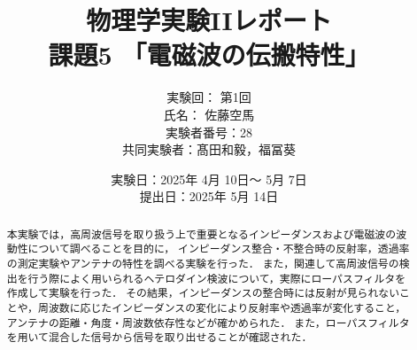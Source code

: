 \documentclass[uplatex,dvipdfmx,a4j,12pt]{jsarticle}
\title{
  物理学実験IIレポート\\    %
  課題5 「電磁波の伝搬特性」
  }
\author{
  実験回： 第1回 \\
  氏名： 佐藤空馬\\
  実験者番号：28
  \\
  共同実験者：髙田和毅，福冨葵
  }
\date{
  実験日：2025年 4月 10日～ 5月 7日 \\
  提出日：2025年 5月 14日}  %
\begin{document}
\maketitle




\vspace{5em}  


%
\begin{abstract}
  本実験では，高周波信号を取り扱う上で重要となるインピーダンスおよび電磁波の波動性について調べることを目的に，
  インピーダンス整合・不整合時の反射率，透過率の測定実験やアンテナの特性を調べる実験を行った．
  また，関連して高周波信号の検出を行う際によく用いられるヘテロダイン検波について，実際にローパスフィルタを作成して実験を行った．
  その結果，インピーダンスの整合時には反射が見られないことや，周波数に応じたインピーダンスの変化により反射率や透過率が変化すること，
  アンテナの距離・角度・周波数依存性などが確かめられた．
  また，ローパスフィルタを用いて混合した信号から信号を取り出せることが確認された．
\end{abstract}

\newpage
\end{document}
